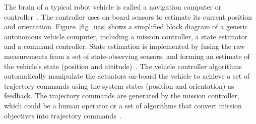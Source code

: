 \documentclass[journal]{IEEEtran}
\begin{document}
The brain of a typical robot vehicle is called a navigation computer or controller~\cite{kealy2011evaluating}. The controller uses on-board sensors to estimate its current position and orientation. Figure~\ref{fig_uas} shows a simplified block diagram of a generic autonomous vehicle computer, including a mission controller, a state estimator and a command controller. State estimation is implemented by fusing the raw measurements from a set of state-observing sensors, and forming an estimate of the vehicle's state (position and attitude)~\cite{barton2012fundamentals}. The vehicle controller algorithms automatically manipulate the actuators on-board the vehicle to achieve a set of trajectory commands using the system states (position and orientation) as feedback. The trajectory commands are generated by the mission controller, which could be a human operator or a set of algorithms that convert mission objectives into trajectory commands~\cite{li2004evolution}. 
\end{document}
